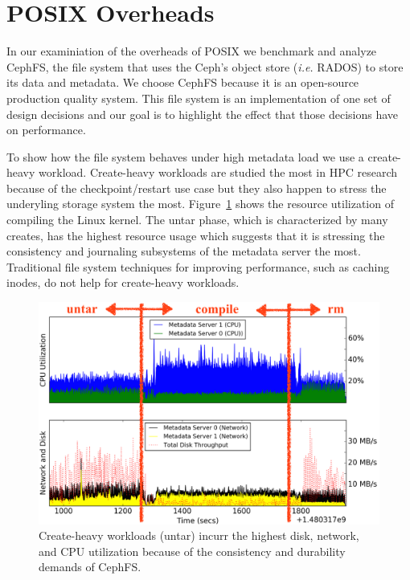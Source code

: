 \section{POSIX Overheads}
\label{sec:posix-overheads}

In our examiniation of the overheads of POSIX we benchmark and analyze CephFS,
the file system that uses the Ceph's object store ({\it i.e.} RADOS) to store
its data and metadata. We choose CephFS because it is an open-source production
quality system. This file system is an implementation of one set of design
decisions and our goal is to highlight the effect that those decisions have on
performance.

To show how the file system behaves under high metadata load we use a
create-heavy workload. Create-heavy workloads are studied the most in HPC
research because of the checkpoint/restart use case but they also happen to
stress the underyling storage system the most.
Figure~\ref{fig:overhead-creates} shows the resource utilization of compiling
the Linux kernel.  The untar phase, which is characterized by many creates, has
the highest resource usage which suggests that it is stressing the consistency
and journaling subsystems of the metadata server the most. Traditional file
system techniques for improving performance, such as caching inodes, do not
help for create-heavy workloads.

\begin{figure}[tb]
\centering
\includegraphics[width=1\linewidth]{./graphs/overhead-creates.png}
\caption{Create-heavy workloads (untar) incurr the highest disk, network, and
CPU utilization because of the consistency and durability demands of
CephFS.}\label{fig:overhead-creates}
\end{figure}

